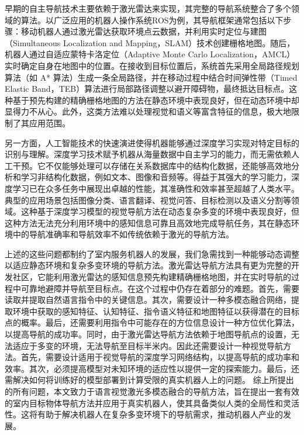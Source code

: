 	早期的自主导航技术主要依赖于激光雷达来实现，其完整的导航系统整合了多个领域的算法。以广泛应用的机器人操作系统ROS\cite{ROS2018}为例，其导航框架通常包括以下步骤：移动机器人通过激光雷达获取环境点云数据，并利用实时定位与建图（Simultaneous Localization and Mapping，SLAM）技术创建栅格地图。随后，机器人通过自适应蒙特卡洛定位（Adaptive Monte Carlo Localization，AMCL）\cite{dellaert1999monte, thrun2001robust} 实时确定自身在地图中的位置。在接收到目标位置后，系统首先采用全局路径规划算法（如 A* 算法\cite{hart1968formal}）生成一条全局路径，并在移动过程中结合时间弹性带（Timed Elastic Band，TEB）算法\cite{rosmann2013efficient}进行局部路径调整以避开障碍物，最终抵达目标点。这种基于预先构建的精确栅格地图的方法在静态环境中表现良好，但在动态环境中却显得力不从心。此外，这类方法难以处理视觉和语义等富含特征的信息，极大地限制了其应用范围。

	另一方面，人工智能技术的快速演进使得机器能够通过深度学习实现对特定目标的识别与理解。深度学习技术赋予机器从海量数据中自主学习的能力，而无需依赖人工干预。它不仅能够处理可以存储在关系数据库中的结构化数据，还能够高效地分析和学习非结构化数据，例如文本、图像和音频等。得益于其强大的学习能力，深度学习已在众多任务中展现出卓越的性能，其准确性和效率甚至超越了人类水平。典型的应用场景包括图像分类、语言翻译、视觉问答、目标检测以及语义分割等领域。这种基于深度学习模型的视觉导航方法在动态复杂多变的环境中表现良好，但这种方法无法充分利用环境中的感知信息可靠且高效地完成导航任务，其在静态环境中的导航准确率和导航效率不如传统依赖于激光的导航方法。

	上述的这些问题都制约了室内服务机器人的发展，我们急需找到一种能够动态调整以适应静态环境和复杂多变环境的导航方法。激光雷达导航方法具有更为完整的开发社区，它能利用激光雷达的感知信息预先构建精确栅格地图，并在实时导航的过程中可靠地避障并导航至目标点。在这个过程中仍存在着部分的难题。首先，需要读取并提取自然语言指令中的关键信息。其次，需要设计一种多模态融合网络，提取环境中获取的感知特征、认知特征、指令语义特征和地图特征以获得潜在的目标点的概率。最后，还需要利用指令中可能存在的方位信息设计一种方位优化算法，以提高导航的成功率。同时，由于激光雷达导航方法依赖于地图导航点的设置，无法适应于多变的环境，无法导航至目标半米内。因此还需要设计一种视觉导航方法。首先，需要设计适用于视觉导航的深度学习网络结构，以提高导航的成功率和效率。其次，必须提高模型对未知环境的适应性以提供一定的探索能力。最后，还需解决如何将训练好的模型部署到计算受限的真实机器人上的问题。
	综上所提出的所有问题，本文致力于语言视觉激光多模态融合的导航方法，旨在提出一套有效的室内目标物体导航方法并应用于真实机器人，使其具备类似人类的全局性和灵活性。这将有助于解决机器人在复杂多变环境下的导航需求，推动机器人产业的发展。

